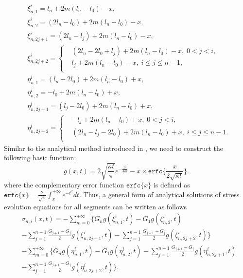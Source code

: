\begin{equation} \label{generalNotations}
\begin{split}
&\xi_{n,1}^{i}=l_n+2m(l_n-l_0)-x,\\
&\xi_{n,2}^{i}=(2l_n-l_0)+2m(l_n-l_0)-x,\\
&\xi_{n,2j+1}^{i}=(2l_n-l_j)+2m(l_n-l_0)-x,\\
&\xi_{n,2j+2}^{i}=\left\{
   \begin{aligned}
   &(2l_n-2l_0+l_j)+2m(l_n-l_0)-x,\;0<j<i,  \\
   &l_j+2m(l_n-l_0)-x,\;i\leq j\leq n-1, \\
      \end{aligned}
   \right. \\
&\eta_{n,1}^{i}=(l_n-2l_0)+2m(l_n-l_0)+x,\\
&\eta_{n,2}^{i}=-l_0+2m(l_n-l_0)+x,\\
&\eta_{n,2j+1}^{i}=(l_j-2l_0)+2m(l_n-l_0)+x,\\
&\eta_{n,2j+2}^{i}=\left\{
   \begin{aligned}
   &-l_j+2m(l_n-l_0)+x,\;0<j<i,  \\
   &(2l_n-l_j-2l_0)+2m(l_n-l_0)+x,\;i\leq j \leq n-1. \\
   \end{aligned}
   \right.
\end{split}
\end{equation}
Similar to the analytical method introduced in \cite{}, we need to construct the following basic function:
\begin{equation} \label{general_basisFunc}
g(x,t)=2\sqrt{\frac{\kappa t}{\pi}}e^{-\frac{x^2}{4\kappa
t}}-x\times\texttt{erfc}\{\frac{x}{2\sqrt{\kappa t}}\}.
\end{equation}
where the complementary error function $\texttt{erfc}\{x\}$ is defined as $\texttt{erfc}\{x\}=\frac{2}{\sqrt{\pi}}\int_x^{+\infty}e^{-t^2}dt$. Thus, a general form of analytical solutions of stress evolution equations for all segments can be written as follows
\begin{equation} \label{eq:general_solution}
\begin{split}
&\sigma_{n,i}(x,t)=-\sum\limits_{m=0}^{+\infty}\{G_ng(\xi_{n,1}^{i},t)-G_1g(\xi_{n,2}^{i},t)\\
&-\sum\limits_{j=1}^{n-1}\frac{G_{j+1}-G_j}{2}g(\xi_{n,2j+1}^{i},t)-\sum\limits_{j=1}^{n-1}\frac{G_{j+1}-G_j}{2}g(\xi_{n,2j+2}^{i},t)\}\\
&-\sum\limits_{m=0}^{+\infty}\{G_ng(\eta_{n,1}^{i},t)-G_1g(\eta_{n,2}^{i},t)-\sum\limits_{j=1}^{n-1}\frac{G_{j+1}-G_j}{2}g(\eta_{n,2j+1}^{i},t)\\
&-\sum\limits_{j=1}^{n-1}\frac{G_{j+1}-G_j}{2}g(\eta_{n,2j+2}^{i},t)\}.
 \end{split}
 \end{equation}
 
